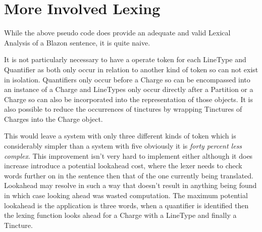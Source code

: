 \section{More Involved Lexing}

While the above pseudo code does provide an adequate and valid Lexical  Analysis of a Blazon sentence, it is quite naive.  

It is not particularly necessary to have a operate token for each LineType and Quantifier as both only occur in relation to another kind of token so can not exist in isolation.   Quantifiers only occur before a Charge so can be encompassed into an instance of a Charge and LineTypes only occur directly after a Partition or a Charge so can also be incorporated into the representation of those objects.  It is also possible to reduce the occurrences of tinctures by wrapping Tinctures of Charges into the  Charge object. 

This would leave a system with only three different kinds of token which is considerably simpler than a system with five obviously it is \emph{forty percent less complex}.  This improvement isn't very hard to implement either although it does increase introduce a potential lookahead cost, where the lexer needs to check words further on in the sentence then that of the one currently being translated.  Lookahead may resolve in such a way that doesn't result in anything being found in which case looking ahead was wasted computation.  The maximum potential lookahead is the application is three words, when a quantifier is identified then the lexing function looks ahead for a Charge with a LineType and finally a Tincture. 



